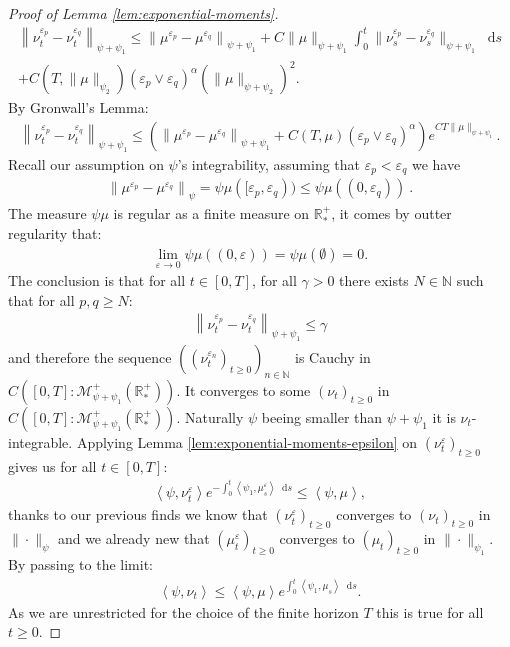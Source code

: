 \documentclass[11pt,a4paper]{article}
\newcommand{\NN}{\mathbb{N}}
\newcommand{\RRP}{\mathbb{R}^+_*}
\newcommand{\MC}{\mathcal{M}}
\newcommand{\Proc}[1]{\left(#1\right)_{t\geq 0}}
\newcommand{\Seq}[1]{\left(#1\right)_{n\in \mathbb{N}}}
\newcommand{\brac}[1]{\left\langle#1\right\rangle}
\newcommand{\dd}{\mathop{}\!\mathrm{d}}
\begin{document}
\begin{proof}[Proof of Lemma \ref{lem:exponential-moments}]
    \begin{multline*}
        \left\| \nu_t^{\varepsilon_p}-\nu_t^{\varepsilon_q}\right\|_{\psi + \psi_1} \leq  \left\| \mu^{\varepsilon_p} - \mu^{\varepsilon_q}\right\|_{\psi + \psi_1} + C\|\mu\|_{\psi + \psi_1}\int_0^t \|\nu_s^{\varepsilon_p}-\nu_s^{\varepsilon_q}\|_{\psi + \psi_1}\dd s \\
        + C\left(T,\|\mu\|_{\psi_2}\right)\left(\varepsilon_p \vee \varepsilon_q \right)^{\alpha} \left(\|\mu\|_{\psi + \psi_2}\right)^2.
    \end{multline*}
    By Gronwall's Lemma:
    \begin{align*}
        \left\| \nu_t^{\varepsilon_p}-\nu_t^{\varepsilon_q}\right\|_{\psi + \psi_1} \leq \left( \left\| \mu^{\varepsilon_p} - \mu^{\varepsilon_q}\right\|_{\psi + \psi_1} + C\left(T,\mu\right)\left(\varepsilon_p \vee \varepsilon_q \right)^{\alpha} \right) e^{CT\|\mu \|_{\psi + \psi_1}}.
    \end{align*}
    Recall our assumption on $\psi$'s integrability, assuming that $\varepsilon_p < \varepsilon_q$ we have
    \begin{align*}
        \left\| \mu^{\varepsilon_p} - \mu^{\varepsilon_q}\right\|_{\psi} = \psi\mu([\varepsilon_p,\varepsilon_q)) \leq \psi\mu\left((0,\varepsilon_q) \right)\ .
    \end{align*}
    The measure $\psi\mu$ is regular as a finite measure on $\RRP$, it comes by outter regularity that:
    \begin{align*}
        \lim\limits_{\varepsilon \to 0} \psi\mu\left((0,\varepsilon)\right) = \psi\mu(\emptyset) = 0.
    \end{align*}
    The conclusion is that for all $t \in [0,T]$, for all $\gamma > 0$ there exists $N \in \NN$ such that for all $p,q \geq N$:
    \begin{align*}
        \left\| \nu_t^{\varepsilon_p}-\nu_t^{\varepsilon_q}\right\|_{\psi + \psi_1} \leq \gamma
    \end{align*}
    and therefore the sequence $\Seq{\Proc{\nu^{\varepsilon_n}_t}}$ is Cauchy in $C([0,T]:\MC^+_{\psi + \psi_1}(\RRP))$. It converges to some $\Proc{\nu_t}$ in $C([0,T]:\MC^+_{\psi + \psi_1}(\RRP))$. Naturally $\psi$ beeing smaller than $\psi + \psi_1$ it is $\nu_t$-integrable. Applying Lemma \ref{lem:exponential-moments-epsilon} on $\Proc{\nu^\varepsilon_t}$ gives us for all $t \in [0,T]$:
    \begin{align*}
        \brac{\psi,\nu^\varepsilon_t}e^{-\int_0^t \brac{\psi_1,\mu^\varepsilon_s}\dd s} \leq \brac{\psi,\mu},
    \end{align*}
    thanks to our previous finds we know that $\Proc{\nu_t^\varepsilon}$ converges to $\Proc{\nu_t}$ in $\|\cdot\|_{\psi}$ and we already new that $\Proc{\mu^\varepsilon_t}$ converges to $\Proc{\mu_t}$ in $\|\cdot\|_{\psi_1}$. By passing to the limit:
    \begin{align*}
        \brac{\psi,\nu_t} \leq  \brac{\psi,\mu} e^{\int_0^t \brac{\psi_1,\mu_s}\dd s}.
    \end{align*}
    As we are unrestricted for the choice of the finite horizon $T$ this is true for all $t \geq 0$. 
    

\end{proof}
\end{document}
